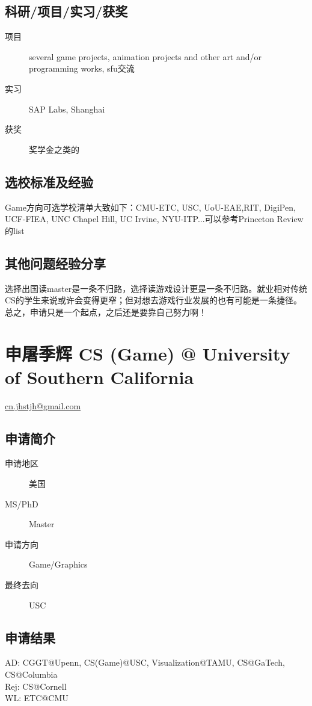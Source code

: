 \documentclass[11pt,fleqn,openany]{book} %
\begin{document}
\subsection*{科研/项目/实习/获奖}
\begin{description}
\item[项目] several game projects, animation projects and other art and/or programming works, sfu交流
\item[实习] SAP Labs, Shanghai
\item[获奖] 奖学金之类的
\end{description}
\subsection*{选校标准及经验}
Game方向可选学校清单大致如下：CMU-ETC, USC, UoU-EAE,RIT, DigiPen, UCF-FIEA, UNC Chapel Hill, UC Irvine, NYU-ITP...可以参考Princeton Review的list
\subsection*{其他问题经验分享}
选择出国读master是一条不归路，选择读游戏设计更是一条不归路。就业相对传统CS的学生来说或许会变得更窄；但对想去游戏行业发展的也有可能是一条捷径。总之，申请只是一个起点，之后还是要靠自己努力啊！
\clearpage
\section{申屠季辉 CS (Game) @ University of Southern California}
\hfill \href{mailto:cn.jhstjh@gmail.com}{cn.jhstjh@gmail.com}

\noindent\begin{minipage}[t]{0.45\textwidth}
\subsection*{申请简介}
\begin{description}
\item[申请地区] 美国
\item[MS/PhD] Master
\item[申请方向] Game/Graphics
\item[最终去向] USC
\end{description}
\end{minipage}
\hfill
\begin{minipage}[t]{0.45\textwidth}
\subsection*{申请结果}
\noindent AD: CGGT@Upenn, CS(Game)@USC, Visualization@TAMU, CS@GaTech, CS@Columbia\\
Rej: CS@Cornell\\
WL: ETC@CMU
\end{minipage}
\end{document}
